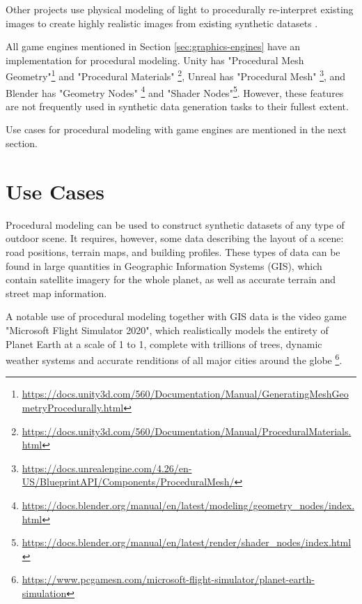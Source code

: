 Other projects use physical modeling of light to procedurally re-interpret existing images to create highly realistic images from existing synthetic datasets \cite{tsirikoglou2017procedural,wrenninge2018synscapes}.

All game engines mentioned in Section \ref{sec:graphics-engines} have an implementation for procedural modeling. Unity has "Procedural Mesh Geometry"\footnote{\url{https://docs.unity3d.com/560/Documentation/Manual/GeneratingMeshGeometryProcedurally.html}} and "Procedural Materials" \footnote{\url{https://docs.unity3d.com/560/Documentation/Manual/ProceduralMaterials.html}}, Unreal has "Procedural Mesh" \footnote{\url{https://docs.unrealengine.com/4.26/en-US/BlueprintAPI/Components/ProceduralMesh/}}, and Blender has "Geometry Nodes" \footnote{\url{https://docs.blender.org/manual/en/latest/modeling/geometry_nodes/index.html}} and "Shader Nodes"\footnote{\url{https://docs.blender.org/manual/en/latest/render/shader_nodes/index.html}}. However, these features are not frequently used in synthetic data generation tasks to their fullest extent.

Use cases for procedural modeling with game engines are mentioned in the next section.

\section{Use Cases}
\label{sec:use-cases}

Procedural modeling can be used to construct synthetic datasets of any type of outdoor scene. It requires, however, some data describing the layout of a scene: road positions, terrain maps, and building profiles. These types of data can be found in large quantities in Geographic Information Systems (GIS), which contain satellite imagery for the whole planet, as well as accurate terrain and street map information.

A notable use of procedural modeling together with GIS data is the video game "Microsoft Flight Simulator 2020", which realistically models the entirety of Planet Earth at a scale of 1 to 1, complete with trillions of trees, dynamic weather systems and accurate renditions of all major cities around the globe \footnote{\url{https://www.pcgamesn.com/microsoft-flight-simulator/planet-earth-simulation}}.

